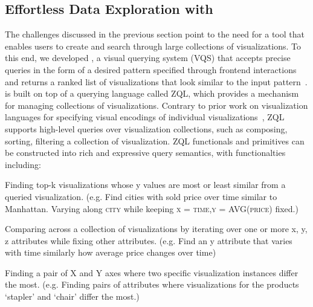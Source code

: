 \subsection{Effortless Data Exploration with \zv}
\par The challenges discussed in the previous section point to the need for a tool that enables users to create and search through large collections of visualizations. To this end, we developed \zv, a visual querying system (VQS) that accepts precise queries in the form of a desired pattern specified through frontend interactions and returns a ranked list of visualizations that look similar to the input pattern~\cite{Siddiqui2016}. \zv is built on top of a querying language called ZQL, which provides a mechanism for managing collections of visualizations. Contrary to prior work on visualization languages for specifying visual encodings of individual visualizations~\cite{Stolte2002,Wilkinson2005}, ZQL supports high-level queries over visualization collections, such as composing, sorting, filtering a collection of visualization. ZQL functionals and primitives can be constructed into rich and expressive query semantics, with functionalties including: 
\squishlist
	\item Finding top-k visualizations whose y values are most or least similar from a queried visualization. (e.g. Find cities with sold price over time similar to Manhattan. Varying along \textsc{city} while keeping \textsc{x = time,y = AVG(price)} fixed.) 
	\item Comparing across a collection of visualizations by iterating over one or more x, y, z attributes while fixing other attributes. (e.g. Find an y attribute that varies with time similarly how average price changes over time)
	\item Finding a pair of X and Y axes where two specific visualization instances differ the most. (e.g. Finding pairs of attributes where visualizations for the products `stapler' and `chair' differ the most.)
\squishend
{}
